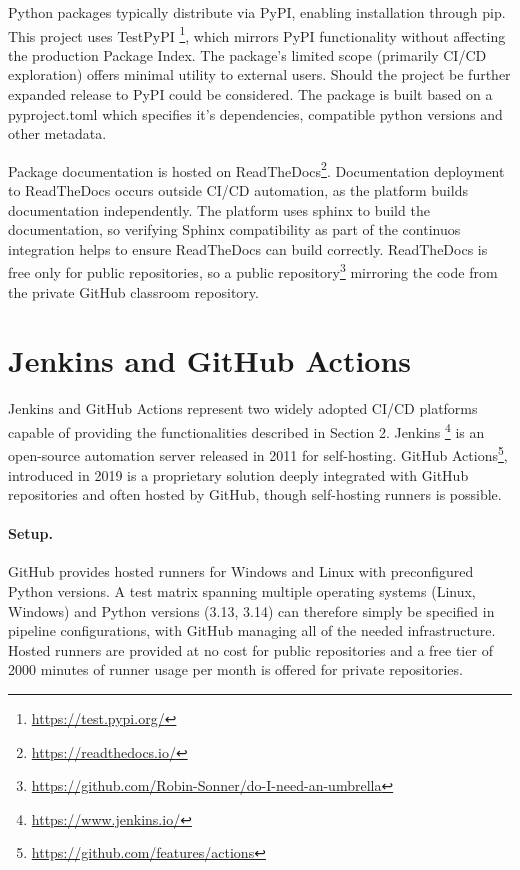 \documentclass{llncs}
\begin{document}
Python packages typically distribute via PyPI, enabling installation through pip. This project uses TestPyPI \footnote{\url{https://test.pypi.org/}}, which mirrors PyPI functionality without affecting the production Package Index. The package's limited scope (primarily CI/CD exploration) offers minimal utility to external users. Should the project be further expanded release to PyPI could be considered. The package is built based on a pyproject.toml which specifies it's dependencies, compatible python versions and other metadata.

Package documentation is hosted on ReadTheDocs\footnote{\url{https://readthedocs.io/}}. Documentation deployment to ReadTheDocs occurs outside CI/CD automation, as the platform builds documentation independently. The platform uses sphinx to build the documentation, so verifying Sphinx compatibility as part of the continuos integration helps to ensure ReadTheDocs can build correctly. ReadTheDocs is free only for public repositories, so a public repository\footnote{\url{https://github.com/Robin-Sonner/do-I-need-an-umbrella}} mirroring the code from the private GitHub classroom repository.


\section{Jenkins and GitHub Actions}

Jenkins and GitHub Actions represent two widely adopted CI/CD platforms capable of providing the functionalities described in Section 2. Jenkins \footnote{\url{https://www.jenkins.io/}} is an open-source automation server released in 2011 for self-hosting. GitHub Actions\footnote{\url{https://github.com/features/actions}}, introduced in 2019 is a proprietary solution deeply integrated with GitHub repositories and often hosted by GitHub, though self-hosting runners is possible.

\paragraph{Setup.} GitHub provides hosted runners for Windows and Linux with preconfigured Python versions. A test matrix spanning multiple operating systems (Linux, Windows) and Python versions (3.13, 3.14) can therefore simply be specified in pipeline configurations, with GitHub managing all of the needed infrastructure. Hosted runners are provided at no cost for public repositories and a free tier of 2000 minutes of runner usage per month is offered for private repositories.
\end{document}
